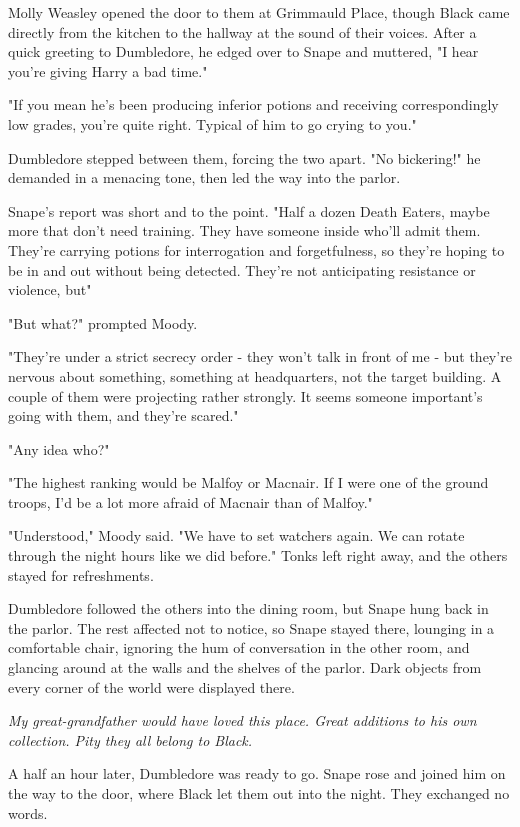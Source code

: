 Molly Weasley opened the door to them at Grimmauld Place, though Black came directly from the kitchen to the hallway at the sound of their voices. After a quick greeting to Dumbledore, he edged over to Snape and muttered, "I hear you're giving Harry a bad time."

"If you mean he's been producing inferior potions and receiving correspondingly low grades, you're quite right. Typical of him to go crying to you."

Dumbledore stepped between them, forcing the two apart. "No bickering!" he demanded in a menacing tone, then led the way into the parlor.

Snape's report was short and to the point. "Half a dozen Death Eaters, maybe more that don't need training. They have someone inside who'll admit them. They're carrying potions for interrogation and forgetfulness, so they're hoping to be in and out without being detected. They're not anticipating resistance or violence, but{\el}"

"But what?" prompted Moody.

"They're under a strict secrecy order - they won't talk in front of me - but they're nervous about something, something at headquarters, not the target building. A couple of them were projecting rather strongly. It seems someone important's going with them, and they're scared."

"Any idea who?"

"The highest ranking would be Malfoy or Macnair. If I were one of the ground troops, I'd be a lot more afraid of Macnair than of Malfoy."

"Understood," Moody said. "We have to set watchers again. We can rotate through the night hours like we did before." Tonks left right away, and the others stayed for refreshments.

Dumbledore followed the others into the dining room, but Snape hung back in the parlor. The rest affected not to notice, so Snape stayed there, lounging in a comfortable chair, ignoring the hum of conversation in the other room, and glancing around at the walls and the shelves of the parlor. Dark objects from every corner of the world were displayed there.

\emph{My great-grandfather would have loved this place. Great additions to his own collection. Pity they all belong to Black.}

A half an hour later, Dumbledore was ready to go. Snape rose and joined him on the way to the door, where Black let them out into the night. They exchanged no words.

